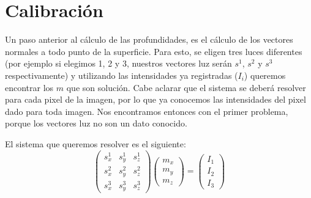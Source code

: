 

\section{Calibración}

Un paso anterior al cálculo de las profundidades, es el cálculo de los vectores normales a todo punto de la superficie. Para esto, se eligen tres luces diferentes (por ejemplo si elegimos 1, 2 y 3, nuestros vectores luz serán $s^{1}$, $s^{2}$ y $s^{3}$ respectivamente) y utilizando las intensidades ya registradas ($I_i$) queremos encontrar los $m$ que son solución. Cabe aclarar que el sistema se deberá resolver para cada pixel de la imagen, por lo que ya conocemos las intensidades del pixel dado para toda imagen. Nos encontramos entonces con el primer problema, porque los vectores luz no son un dato conocido.

El sistema que queremos resolver es el siguiente: \\

\[
\begin{pmatrix}
    s_{x}^{1} & s_{y}^{1} & s_{z}^{1} \\
    s_{x}^{2} & s_{y}^{2} & s_{z}^{2} \\
    s_{x}^{3} & s_{y}^{3} & s_{z}^{3}
\end{pmatrix}
\begin{pmatrix}
    m_{x} \\
    m_{y} \\
    m_{z}
\end{pmatrix}
=
\begin{pmatrix}
    I_{1} \\
    I_{2} \\
    I_{3}
\end{pmatrix}
\]

